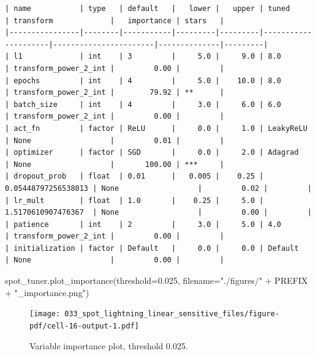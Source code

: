 \documentclass[
  letterpaper,
  DIV=11,
  numbers=noendperiod]{scrreprt}
\newenvironment{Shaded}{\begin{snugshade}}{\end{snugshade}}
\newcommand{\FloatTok}[1]{\textcolor[rgb]{0.68,0.00,0.00}{#1}}
\newcommand{\NormalTok}[1]{\textcolor[rgb]{0.00,0.23,0.31}{#1}}
\newcommand{\OperatorTok}[1]{\textcolor[rgb]{0.37,0.37,0.37}{#1}}
\newcommand{\StringTok}[1]{\textcolor[rgb]{0.13,0.47,0.30}{#1}}
\begin{document}
\begin{verbatim}
| name           | type   | default   |   lower |   upper | tuned               | transform             |   importance | stars   |
|----------------|--------|-----------|---------|---------|---------------------|-----------------------|--------------|---------|
| l1             | int    | 3         |     5.0 |     9.0 | 8.0                 | transform_power_2_int |         0.00 |         |
| epochs         | int    | 4         |     5.0 |    10.0 | 8.0                 | transform_power_2_int |        79.92 | **      |
| batch_size     | int    | 4         |     3.0 |     6.0 | 6.0                 | transform_power_2_int |         0.00 |         |
| act_fn         | factor | ReLU      |     0.0 |     1.0 | LeakyReLU           | None                  |         0.01 |         |
| optimizer      | factor | SGD       |     0.0 |     2.0 | Adagrad             | None                  |       100.00 | ***     |
| dropout_prob   | float  | 0.01      |   0.005 |    0.25 | 0.05448797256538013 | None                  |         0.02 |         |
| lr_mult        | float  | 1.0       |    0.25 |     5.0 | 1.5170610907476367  | None                  |         0.00 |         |
| patience       | int    | 2         |     3.0 |     5.0 | 4.0                 | transform_power_2_int |         0.00 |         |
| initialization | factor | Default   |     0.0 |     0.0 | Default             | None                  |         0.00 |         |
\end{verbatim}

\begin{Shaded}
\begin{Highlighting}[]
\NormalTok{spot\_tuner.plot\_importance(threshold}\OperatorTok{=}\FloatTok{0.025}\NormalTok{,}
\NormalTok{    filename}\OperatorTok{=}\StringTok{"./figures/"} \OperatorTok{+}\NormalTok{ PREFIX }\OperatorTok{+} \StringTok{"\_importance.png"}\NormalTok{)}
\end{Highlighting}
\end{Shaded}

\begin{figure}[H]

{\centering \texttt{[image: 033\_spot\_lightning\_linear\_sensitive\_files/figure-pdf/cell-16-output-1.pdf]}

}

\caption{Variable importance plot, threshold 0.025.}

\end{figure}%
\end{document}
